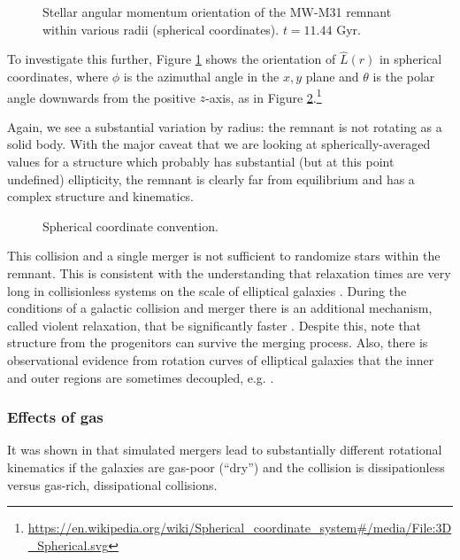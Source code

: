\documentclass[twocolumn]{aastex63}
\begin{document}
\begin{figure}[htb!]
	\caption{Stellar angular momentum orientation of the MW-M31 remnant within various radii (spherical coordinates). $t = 11.44$ Gyr.
		\label{fig:rem_phi_theta}}
\end{figure}

To investigate this further, Figure \ref{fig:rem_phi_theta} shows the orientation of $\hat{L}(r)$ in spherical coordinates, where $\phi$ is the azimuthal angle in the $x,y$ plane and $\theta$ is the polar angle downwards from the positive $z$-axis, as in Figure \ref{fig:sph_coord}.\footnote{\url{https://en.wikipedia.org/wiki/Spherical\_coordinate\_system\#/media/File:3D\_Spherical.svg}} 

Again, we see a substantial variation by radius: the remnant is not rotating as a solid body. With the major caveat that we are looking at spherically-averaged values for a structure which probably has substantial (but at this point undefined) ellipticity, the remnant is clearly far from equilibrium and has a complex structure and kinematics.

\begin{figure}[htb!]
	\caption{Spherical coordinate convention.
		\label{fig:sph_coord}}
\end{figure}

This collision and a single merger is not sufficient to randomize stars within the remnant. This is consistent with the understanding that relaxation times are very long in collisionless systems on the scale of elliptical galaxies \citep[Section 1.2]{binney_galactic_2008}. During the conditions of a galactic collision and merger there is an additional mechanism, called violent relaxation, that be significantly faster \citep[Section 4.10.2]{lynden-bell_statistical_1967, binney_galactic_2008}. Despite this, \citet{barnes_dynamics_1992} note that structure from the progenitors can survive the merging process. Also, there is observational evidence from rotation curves of elliptical galaxies that the inner and outer regions are sometimes decoupled, e.g. \citep{napolitano_ngc_2002}.

\subsubsection{Effects of gas}

It was shown in \citep{cox_kinematic_2006} that simulated mergers lead to substantially different rotational kinematics if the galaxies are gas-poor (``dry'') and the collision is dissipationless versus gas-rich, dissipational collisions.
\end{document}
